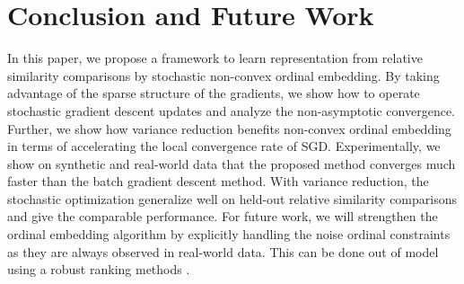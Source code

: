 \documentclass[letterpaper]{article}
\begin{document}
		

		\section{Conclusion and Future Work}

		In this paper, we propose a framework to learn representation from relative similarity comparisons by stochastic non-convex ordinal embedding. By taking advantage of the sparse structure of the gradients, we show how to operate stochastic gradient descent updates and analyze the non-asymptotic convergence. Further, we show how variance reduction benefits non-convex ordinal embedding in terms of accelerating the local convergence rate of SGD. Experimentally, we show on synthetic and real-world data that the proposed method converges much faster than the batch gradient descent method. With variance reduction, the stochastic optimization generalize well on held-out relative similarity comparisons and give the comparable performance. For future work, %
		we will strengthen the ordinal embedding algorithm by explicitly handling the noise ordinal constraints as they are always observed in real-world data. This can be done out of model using a robust ranking methods \cite{2014arXiv1408.3467X}.

		
		

	
\end{document}
